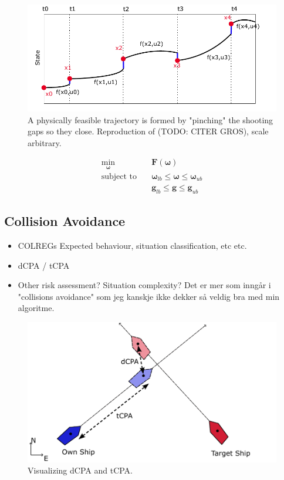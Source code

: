 \begin{figure}
    \label{FIG: Shooting Gaps}
    \includegraphics[width=\textwidth]{Images/MultipleShooting.pdf}
    \caption{A physically feasible trajectory is formed by "pinching" the shooting gaps so they close. Reproduction of (TODO: CITER GROS), scale arbitrary.}
\end{figure}

\begin{subequations}
    \label{EQ:NLP}
    \begin{align}
        \min_{\boldsymbol{\omega}} \quad & \textbf{F}(\boldsymbol{\omega}) \label{eq:NLP-1} \\
        \textrm{subject to} \quad & \boldsymbol{\omega}_{lb} \leq \boldsymbol{\omega} \leq \boldsymbol{\omega}_{ub} \\ 
        \quad & \textbf{g}_{lb} \leq \textbf{g} \leq \textbf{g}_{ub}
    \end{align}
\end{subequations}


\subsection{Collision Avoidance}
\begin{itemize}
    \item \gls{COLREGs}
    \subitem Expected behaviour, situation classification, etc etc.
    \item \gls{dCPA} / \gls{tCPA}
    \item Other risk assessment? Situation complexity? Det er mer som inngår i "collisions avoidance" som jeg kanskje ikke dekker så veldig bra med min algoritme.
\end{itemize}

\begin{figure}
    \centering
    \label{FIG: ship CPA}
    \includegraphics[width=\textwidth]{Images/shipCPA.pdf}
    \caption{Visualizing dCPA and tCPA.}
\end{figure}

